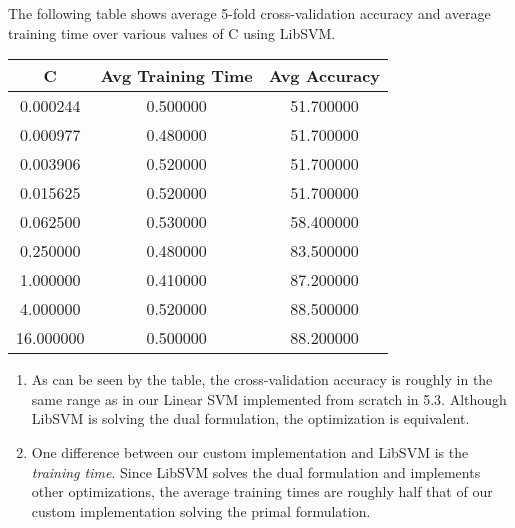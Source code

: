 \documentclass[12pt]{article}
\begin{document}
	The following table shows average 5-fold cross-validation accuracy and average training time over various values of C using LibSVM.
	\begin{center}
	\begin{tabular}{| c | c | c |} 
		\hline
	    	C & Avg Training Time & Avg Accuracy \\
		\hline \hline
		0.000244 & 0.500000 & 51.700000 \\
		\hline
		0.000977 & 0.480000 & 51.700000 \\
		\hline
		0.003906 & 0.520000 & 51.700000 \\
		\hline
		0.015625 & 0.520000 & 51.700000 \\
		\hline
		0.062500 & 0.530000 & 58.400000 \\
		\hline
		0.250000 & 0.480000 & 83.500000 \\
		\hline
		1.000000 & 0.410000 & 87.200000 \\
		\hline
		4.000000 & 0.520000 & 88.500000 \\
		\hline
		16.000000 & 0.500000 & 88.200000 \\
		\hline
	    \end{tabular}
	\end{center}

\begin{enumerate}[label=\alph*.]
	\item As can be seen by the table, the cross-validation accuracy is roughly in the same range as in our Linear SVM implemented from scratch in 5.3. Although LibSVM is solving the dual formulation, the optimization is equivalent.
	\item One difference between our custom implementation and LibSVM is the \textit{training time}. Since LibSVM solves the dual formulation and implements other optimizations, the average training times are roughly half that of our custom implementation solving the primal formulation.
\end{enumerate}
\end{document}

